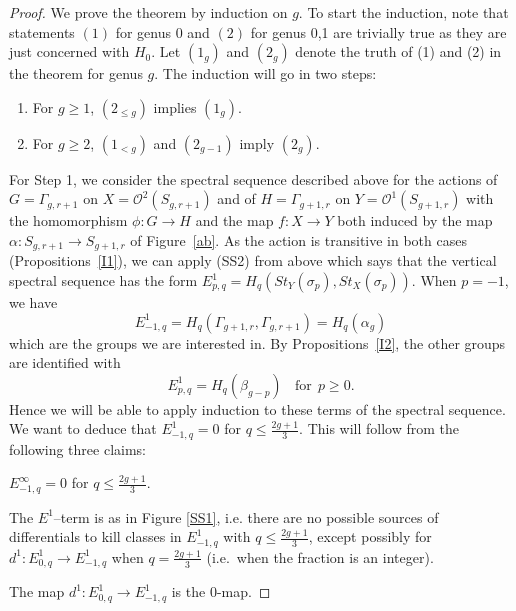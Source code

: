 \documentclass[10pt]{amsart}
\newcommand{\vs}{\vspace{4mm}}
\newcommand{\no}{\noindent}
\newcommand{\OO}{\mathcal{O}}
\newcommand{\al}{\alpha}
\newcommand{\be}{\beta}
\newcommand{\Ga}{\Gamma}
\newcommand{\s}{\sigma}
\begin{document}
\begin{proof}
We prove the theorem by induction on $g$. To start the induction, note that statements $(1)$ for genus 0 and $(2)$ for genus 0,1 
are trivially true as
they are just concerned with $H_0$. Let $(1_g)$ and $(2_g)$ denote the truth of (1) and (2) in the theorem for genus $g$. 
The induction will go in two steps: 
\begin{enumerate}
\item For $g\ge 1$, $(2_{\le g})$ implies $(1_g)$.
\item For $g\ge 2$, $(1_{<g})$ and $(2_{g-1})$ imply $(2_g)$.
\end{enumerate}


\vs

For Step 1, we consider the spectral sequence described above for the actions of $G=\Ga_{g,r+1}$ on $X=\OO^2(S_{g,r+1})$ and of 
$H=\Ga_{g+1,r}$ on $Y=\OO^1(S_{g+1,r})$ with the homomorphism $\phi\colon G\to H$ and the map $f\colon X\to Y$ both induced by the map
$\al\colon S_{g,r+1}\to S_{g+1,r}$ of Figure~\ref{ab}.  
As the action is transitive in both cases (Propositions~\ref{I1}), we can apply (SS2) from above 
which says that the vertical spectral sequence has the form 
$E^1_{p,q}=H_q(St_Y(\s_p),St_X(\s_p))$. 
When $p=-1$, we have  
$$E^1_{-1,q}=H_q(\Ga_{g+1,r},\Ga_{g,r+1})=H_q(\al_g)$$ which are the groups we are interested in. 
By Propositions~\ref{I2}, the other groups are identified with 
$$E_{p,q}^1=H_q(\be_{g-p}) \ \ \ \ \textrm{for}\ \  p\ge 0.$$
Hence we will be able to apply induction to these terms of the spectral sequence. We want  
to deduce that $E^1_{-1,q}=0$  for $q\le \frac{2g+1}{3}$. 
This will follow from the following three claims: 

\smallskip
\no {\em Claim 1:} 
$E^\infty_{-1,q}=0$ for $q\le \frac{2g+1}{3}$. 

\smallskip 
\no {\em Claim 2:} 
The $E^1$--term is as in Figure \ref{SS1}, i.e. there are no possible sources of differentials to kill classes in
$E^1_{-1,q}$ with $q\le \frac{2g+1}{3}$, except possibly for $d^1\colon E^1_{0,q}\to E^1_{-1,q}$ when $q=\frac{2g+1}{3}$
(i.e.~when the fraction is an integer). 

\smallskip
\no {\em Claim 3:} 
The map $d^1\colon E^1_{0,q}\to E^1_{-1,q}$ is the 0-map. 




\end{proof}
\end{document}
